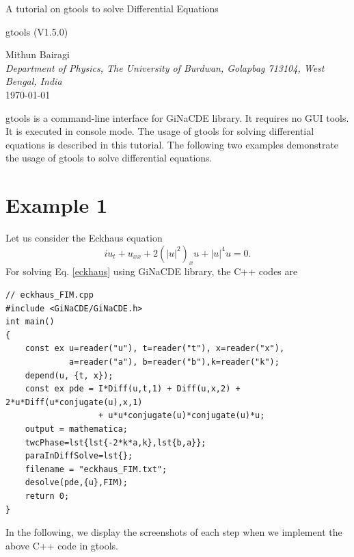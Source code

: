 \documentclass[11pt,a4paper,titlepage]{article}
\begin{document}
\begin{titlepage}
\begin{center}
\Huge {A tutorial on gtools to solve Differential Equations} 
\end{center}
\vspace{3cm}
\begin{center}
\Large{gtools (V1.5.0)}
\end{center}
\vspace{2cm} 
\begin{center} 
Mithun Bairagi \\[3pt]  
\textit{Department of Physics, The University of Burdwan, Golapbag 713104, West Bengal, India} \\ [1cm]
\today
\end{center}
\end{titlepage}
 
\clearpage
gtools is a command-line interface for GiNaCDE library. It requires no GUI tools. It is executed in console mode. 
The usage of gtools for solving differential equations is described in this tutorial. The following two examples demonstrate the usage of gtools to solve differential equations.
\section{Example 1}
Let us consider the Eckhaus equation 
\begin{equation}\label{eckhaus}
	i{u_t} + {u_{xx}} + 2{\left( {{{\left| u \right|}^2}} \right)_x}u + {\left| u \right|^4}u = 0.
\end{equation}
For solving Eq. \eqref{eckhaus} using GiNaCDE library, the C++ codes are\\
\begin{verbatim}
// eckhaus_FIM.cpp
#include <GiNaCDE/GiNaCDE.h>
int main()
{
    const ex u=reader("u"), t=reader("t"), x=reader("x"), 
             a=reader("a"), b=reader("b"),k=reader("k");   
    depend(u, {t, x});
    const ex pde = I*Diff(u,t,1) + Diff(u,x,2) + 2*u*Diff(u*conjugate(u),x,1)
                   + u*u*conjugate(u)*conjugate(u)*u;
    output = mathematica;  
    twcPhase=lst{lst{-2*k*a,k},lst{b,a}};
    paraInDiffSolve=lst{};
    filename = "eckhaus_FIM.txt";
    desolve(pde,{u},FIM);
    return 0;
}
\end{verbatim}
In the following, we display the screenshots of each step when we implement the above C++ code in gtools.
\end{document}
